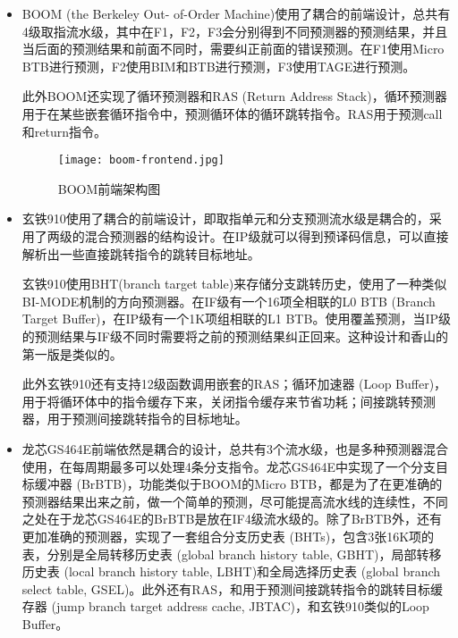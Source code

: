 \begin{itemize}[listparindent=2em]
	\item BOOM (the Berkeley Out-
    of-Order Machine)\cite{boom-spec, sonic-boom}使用了耦合的前端设计，总共有4级取指流水级，其中在F1，F2，F3会分别得到不同预测器的预测结果，并且当后面的预测结果和前面不同时，需要纠正前面的错误预测。在F1使用Micro BTB进行预测，F2使用BIM和BTB进行预测，F3使用TAGE进行预测。
    
    此外BOOM还实现了循环预测器和RAS (Return Address Stack)，循环预测器用于在某些嵌套循环指令中，预测循环体的循环跳转指令。RAS用于预测call和return指令。

    \begin{figure}[htb]
        \centering
        \setlength\tabcolsep{3pt}  %
        \vspace{5pt} %
        \texttt{[image: boom-frontend.jpg]}
        \caption{BOOM前端架构图\cite{boom-frontend}}
        \label{fig:figure11}
    \end{figure}

	\item 玄铁910\cite{xuantie}使用了耦合的前端设计，即取指单元和分支预测流水级是耦合的，采用了两级的混合预测器的结构设计。在IP级就可以得到预译码信息，可以直接解析出一些直接跳转指令的跳转目标地址。

    玄铁910使用BHT(branch target table)来存储分支跳转历史，使用了一种类似BI-MODE\cite{bi-mode}机制的方向预测器。在IF级有一个16项全相联的L0 BTB (Branch Target Buffer)，在IP级有一个1K项组相联的L1 BTB。使用覆盖预测，当IP级的预测结果与IF级不同时需要将之前的预测结果纠正回来。这种设计和香山的第一版是类似的。

    此外玄铁910还有支持12级函数调用嵌套的RAS；循环加速器 (Loop Buffer)，用于将循环体中的指令缓存下来，关闭指令缓存来节省功耗；间接跳转预测器，用于预测间接跳转指令的目标地址。

    \item 龙芯GS464E\cite{loongson}前端依然是耦合的设计，总共有3个流水级，也是多种预测器混合使用，在每周期最多可以处理4条分支指令。龙芯GS464E中实现了一个分支目标缓冲器 (BrBTB)，功能类似于BOOM的Micro BTB，都是为了在更准确的预测器结果出来之前，做一个简单的预测，尽可能提高流水线的连续性，不同之处在于龙芯GS464E的BrBTB是放在IF4级流水级的。除了BrBTB外，还有更加准确的预测器，实现了一套组合分支历史表 (BHTs)，包含3张16K项的表，分别是全局转移历史表 (global branch history table, GBHT)，局部转移历史表 (local branch history table, LBHT)和全局选择历史表 (global branch select table, GSEL)。此外还有RAS，和用于预测间接跳转指令的跳转目标缓存器 (jump branch target address cache, JBTAC)，和玄铁910类似的Loop Buffer。
    

\end{itemize}
